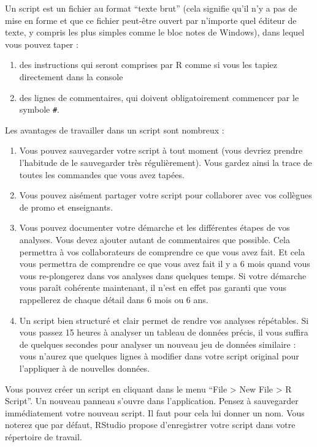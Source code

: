 \documentclass[a4paperpaper,]{article}
\providecommand{\tightlist}{%
  \setlength{\itemsep}{0pt}\setlength{\parskip}{0pt}}
\theoremstyle{definition}
\theoremstyle{definition}
\theoremstyle{definition}
\theoremstyle{remark}
\begin{document}
Un script est un fichier au format ``texte brut'' (cela signifie qu'il
n'y a pas de mise en forme et que ce fichier peut-être ouvert par
n'importe quel éditeur de texte, y compris les plus simples comme le
bloc notes de Windows), dans lequel vous pouvez taper :

\begin{enumerate}
\def\labelenumi{\arabic{enumi}.}
\tightlist
\item
  des instructions qui seront comprises par R comme si vous les tapiez
  directement dans la console
\item
  des lignes de commentaires, qui doivent obligatoirement commencer par
  le symbole \texttt{\#}.
\end{enumerate}

Les avantages de travailler dans un script sont nombreux :

\begin{enumerate}
\def\labelenumi{\arabic{enumi}.}
\tightlist
\item
  Vous pouvez sauvegarder votre script à tout moment (vous devriez
  prendre l'habitude de le sauvegarder très régulièrement). Vous gardez
  ainsi la trace de toutes les commandes que vous avez tapées.
\item
  Vous pouvez aisément partager votre script pour collaborer avec vos
  collègues de promo et enseignants.
\item
  Vous pouvez documenter votre démarche et les différentes étapes de vos
  analyses. Vous devez ajouter autant de commentaires que possible. Cela
  permettra à vos collaborateurs de comprendre ce que vous avez fait. Et
  cela vous permettra de comprendre ce que vous avez fait il y a 6 mois
  quand vous vous re-plongerez dans vos analyses dans quelques temps. Si
  votre démarche vous paraît cohérente maintenant, il n'est en effet pas
  garanti que vous rappellerez de chaque détail dans 6 mois ou 6 ans.
\item
  Un script bien structuré et clair permet de rendre vos analyses
  répétables. Si vous passez 15 heures à analyser un tableau de données
  précis, il vous suffira de quelques secondes pour analyser un nouveau
  jeu de données similaire : vous n'aurez que quelques lignes à modifier
  dans votre script original pour l'appliquer à de nouvelles données.
\end{enumerate}

Vous pouvez créer un script en cliquant dans le menu ``File
\textgreater{} New File \textgreater{} R Script''. Un nouveau panneau
s'ouvre dans l'application. Pensez à sauvegarder immédiatement votre
nouveau script. Il faut pour cela lui donner un nom. Vous noterez que
par défaut, RStudio propose d'enregistrer votre script dans votre
répertoire de travail.
\end{document}
